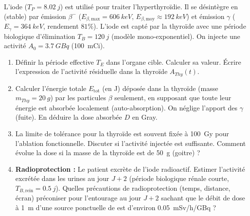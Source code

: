 \documentclass[11pt]{article}
\begin{document}
\begin{exercice}
L'iode  ($T_P = \SI{8,02}{j}$) est utilisé pour traiter l'hyperthyroïdie. Il se désintègre en  (stable) par émission $\beta^-$ ($E_{\beta,\text{max}} = \SI{606}{keV}$, $E_{\beta,\text{moy}} \approx \SI{192}{keV}$) et émission $\gamma$ ($E_\gamma = \SI{364}{keV}$, rendement $81\%$). L'iode est capté par la thyroïde avec une période biologique d'élimination $T_B = \SI{120}{j}$ (modèle mono-exponentiel). On injecte une activité $A_0 = \SI{3,7}{GBq}$ (\SI{100}{mCi}).
\begin{enumerate}
    \item Définir la période effective $T_E$ dans l'organe cible. Calculer sa valeur. Écrire l'expression de l'activité résiduelle dans la thyroïde $A_{Thy}(t)$.
    \item Calculer l'énergie totale $E_{\text{tot}}$ (en J) déposée dans la thyroïde (masse $m_{Thy} = \SI{20}{g}$) par les particules $\beta$ seulement, en supposant que toute leur énergie est absorbée localement (auto-absorption). On néglige l'apport des $\gamma$ (fuite). En déduire la dose absorbée $D$ en Gray.
    \item La limite de tolérance pour la thyroïde est souvent fixée à \SI{100}{Gy} pour l'ablation fonctionnelle. Discuter si l'activité injectée est suffisante. Comment évolue la dose si la masse de la thyroïde est de \SI{50}{g} (goitre) ?
    \item \textbf{Radioprotection :} Le patient excrète de l'iode radioactif. Estimer l'activité excrétée dans les urines au jour $J+2$ (période biologique rénale courte, $T_{B,\text{rein}} = \SI{0,5}{j}$). Quelles précautions de radioprotection (temps, distance, écran) préconiser pour l'entourage au jour $J+2$ sachant que le débit de dose à \SI{1}{m} d'une source ponctuelle de  est d'environ \SI{0,05}{mSv/h/GBq} ?
\end{enumerate}
\end{exercice}
\end{document}
